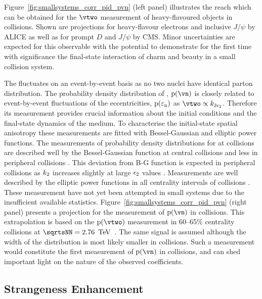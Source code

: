 \documentclass[../report.tex]{subfiles}
\begin{document}
Figure~\ref{fig:smallsystems_corr_pid_pvn} (left panel) illustrates the reach which can be obtained for the $\vtwo$ measurement of heavy-flavoured objects in \pPb collisions. Shown are projections for heavy-flavour electrons and inclusive $J/\psi$ by ALICE as well as for prompt $D$ and $J/\psi$ by CMS. Minor uncertainties are expected for this observable with the potential to demonstrate for the first time with significance the final-state interaction of charm and beauty in a small collision system.

The \vn fluctuates on an event-by-event basis as no two nuclei have identical parton distribution. The probability density distribution of \vn, ${\rm p}(\vn)$ is closely related to event-by-event fluctuations of the eccentricities, ${\rm p}(\varepsilon_{\rm{n}})$ as $\vtwo \propto k_{\rm{2}\epsilon_{\rm{2}}}$. Therefore its measurement provides crucial information about the initial conditions and the final-state dynamics of the medium. To characterise the initial-state spatial anisotropy these measurements are fitted with Bessel-Gaussian and elliptic power functions. The measurements of probability density distributions for \vtwo at \PbPb collisions are described well by the Bessel-Gaussian function at central collisions and less in peripheral collisions \cite{Aad:2013xma, Sirunyan:2017fts}. This deviation from B-G function is expected in peripheral collisions as $k_{\rm{2}}$ increases slightly at large $\epsilon_{\rm{2}}$ values \cite{Jia:2014jca}. Measurements are well described by the elliptic power functions in all centrality intervals of \PbPb collisions \cite{Sirunyan:2017fts}. These measurement have not yet been attempted in small systems due to the insufficient available statistics. Figure~\ref{fig:smallsystems_corr_pid_pvn} (right panel) presents a projection for the measurement of ${\rm p}(\vn)$ in \pp collisions. This extrapolation is based on the ${\rm p}(\vtwo)$ measurement in 60--65\% centrality \PbPb collisions at $\sqrtsNN = \unit[2.76]{\UTeV}$~\cite{Aad:2013xma}. The same signal is assumed although the width of the distribution is most likely smaller in \pp collisions. Such a measurement would constitute the first measurement of ${\rm p}(\vn)$ in \pp collisions, and can shed important light on the nature of the observed \vtwo coefficients.


\subsection{Strangeness Enhancement}
\label{sect:smallsystems_strangeness}
\end{document}
